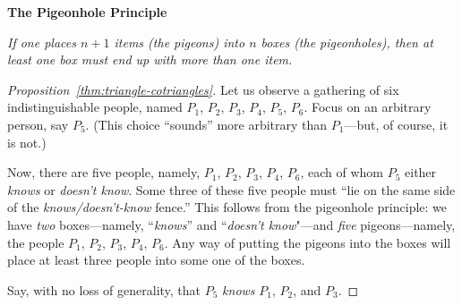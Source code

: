 \bigskip


\noindent 
\hspace*{.1in}\begin{minipage}{0.95\textwidth}
{\bf The Pigeonhole Principle}

{\em If one places $n+1$ items (the pigeons) into $n$ boxes (the pigeonholes), then at least one box must end up with more than one item.}
\end{minipage} 

\bigskip

\begin{proof}[Proposition~\ref{thm:triangle-cotriangles}]
Let us observe a gathering of six indistinguishable people, named $P_1$, $P_2$, $P_3$, $P_4$, $P_5$, $P_6$.  Focus on an arbitrary person, say $P_5$.  (This choice ``sounds'' more arbitrary than $P_1$---but, of course, it is not.)

\smallskip

Now, there are five people, namely, $P_1$, $P_2$, $P_3$, $P_4$, $P_6$, each of whom $P_5$ either {\em knows} or {\em doesn't know}.  Some three of these five people must ``lie on the same side of the {\em knows/doesn't-know} fence.''  This follows from the pigeonhole principle: we have {\em two} boxes---namely, ``{\em knows}'' and ``{\em doesn't know}"---and {\em five} pigeons---namely, the people $P_1$, $P_2$, $P_3$, $P_4$, $P_6$.  Any way of putting the pigeons into the boxes will place at least three people into some one of the boxes.

Say, with no loss of generality, that $P_5$ {\em knows} $P_1$, $P_2$, and $P_3$.

\medskip

\noindent {}
\end{proof}
